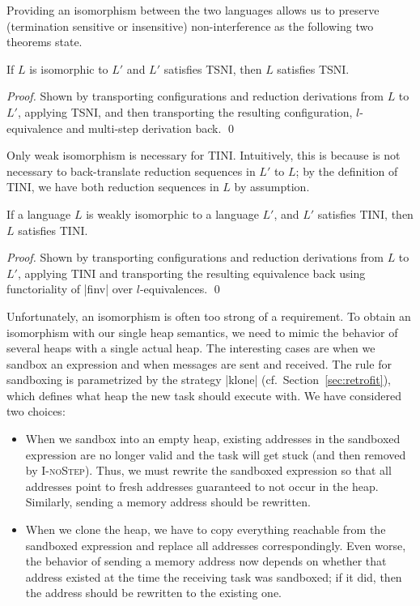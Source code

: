 Providing an isomorphism between the two languages allows us to
preserve (termination sensitive or insensitive) non-interference
as the following two theorems state.

\begin{theorem}
  \label{thm:iso-tsni}
  If $L$ is isomorphic to $L'$ and $L'$ satisfies TSNI, then
  $L$ satisfies TSNI.
\end{theorem}

\begin{proof}
  Shown by transporting configurations and reduction derivations from
  $L$ to $L'$, applying TSNI, and then transporting the
  resulting configuration, $l$-equivalence and multi-step derivation back.
  \qed
\end{proof}

Only weak isomorphism is necessary for TINI. Intuitively, this is because
is not necessary to back-translate reduction sequences in $L'$ to
$L$; by the definition of TINI, we have both reduction sequences in $L$
by assumption.

\begin{theorem}
  \label{thm:iso-tini}
  If a language $L$ is weakly isomorphic to a language $L'$, and $L'$
  satisfies TINI, then $L$ satisfies TINI.
\end{theorem}

\begin{proof}
  Shown by transporting configurations and reduction derivations
  from $L$ to $L'$, applying TINI and transporting the resulting
  equivalence back using functoriality of |finv| over $l$-equivalences.
  \qed
\end{proof}

Unfortunately, an isomorphism is often too strong of a requirement.
To obtain an isomorphism with our single heap semantics, we need to mimic the
behavior of several heaps with a single actual heap.
The interesting cases are when we sandbox
an expression and when messages are sent and received.
The rule for sandboxing is
parametrized by the strategy |klone| (cf.\ Section~\ref{sec:retrofit}),
which defines what heap the new task
should execute with.  We have considered two choices:

\begin{itemize}
    \item When we sandbox into an empty heap, existing addresses
in the sandboxed expression are no longer valid and the
task will get stuck (and then removed by \textsc{I-noStep}).
Thus, we must rewrite the sandboxed expression so that
all addresses point to fresh addresses
guaranteed to not occur in the heap.  Similarly,
sending a memory address should be rewritten.

\item When we clone the heap, we have to copy everything
reachable from the sandboxed expression and replace all addresses
correspondingly.  Even worse, the behavior of sending a memory address
now depends on whether that address existed at the time the receiving
task was sandboxed;  if it did, then the address should be rewritten to the
existing one.
\end{itemize}

